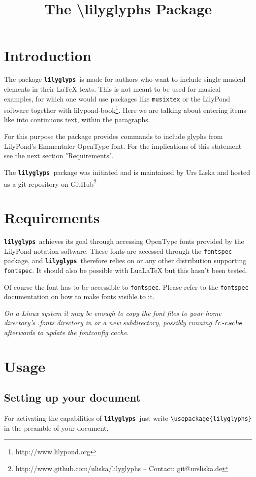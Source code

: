 \documentclass{article}
\title{The \textbackslash lilyglyphs Package}
\newcommand{\lilyglyphs}{\texttt{\textbf{lilyglyp\sharp s }}}
\newcommand*{\cmd}[1]{\texttt{\textbackslash #1}}
\begin{document}
\maketitle
\tableofcontents
\section{Introduction}
The package \lilyglyphs is made for authors who want to include single musical elements in their \LaTeX{} texts. This is not meant to be used for musical examples, for which one would use packages like \texttt{musixtex} or the LilyPond software together with lilypond-book\footnote{http://www.lilypond.org}. Here we are talking about entering items like \lilyRFZ* into continuous text, within the paragraphs.

For this purpose the package provides commands to include glyphs from LilyPond's Emmentaler OpenType font. For the implications of this statement see the next section "Requirements".

The \lilyglyphs package was initiated and is maintained by Urs Liska and hosted as a git repository on GitHub\footnote{http://www.github.com/uliska/lilyglyphs -- Contact: git@ursliska.de}

\section{Requirements}
\lilyglyphs achieves its goal through accessing OpenType fonts provided by the LilyPond notation software. These fonts are accessed through the \texttt{fontspec} package, and \lilyglyphs therefore relies on or any other distribution supporting \texttt{fontspec}. It should also be possible with LuaLaTeX but this hasn't been tested.

Of course the font has to be accessible to \texttt{fontspec}. Please refer to the \texttt{fontspec} documentation on how to make fonts visible to it. 

\textit{On a Linux system it may be enough to copy the font files to your home directory's .fonts directory in or a new subdirectory, possibly running \texttt{fc-cache} afterwards to update the fontconfig cache.}



\section{Usage}
\subsection{Setting up your document}
For activating the capabilities of \lilyglyphs just write \cmd{usepackage\{lilyglyphs\}} in the preamble of your document.
\end{document}
